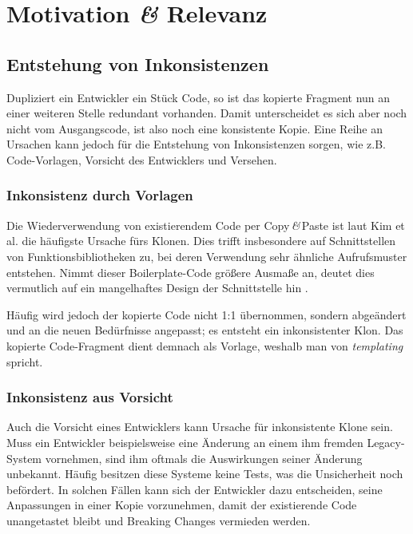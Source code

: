 \section{Motivation \textit{\&} Relevanz}

\subsection{Entstehung von Inkonsistenzen}

Dupliziert ein Entwickler ein Stück Code, so ist das kopierte Fragment nun an einer weiteren Stelle redundant vorhanden. Damit unterscheidet es sich aber noch nicht vom Ausgangscode, ist also noch eine konsistente Kopie. Eine Reihe an Ursachen kann jedoch für die Entstehung von Inkonsistenzen sorgen, wie z.B. Code-Vorlagen, Vorsicht des Entwicklers und Versehen.


\subsubsection{Inkonsistenz durch Vorlagen}

Die Wiederverwendung von existierendem Code per Copy\,\textit{\&}\,Paste ist laut Kim et al. \cite{kim2004ethnographic} die häufigste Ursache fürs Klonen. Dies trifft insbesondere auf Schnittstellen von Funktionsbibliotheken zu, bei deren Verwendung sehr ähnliche Aufrufsmuster entstehen. Nimmt dieser Boilerplate-Code größere Ausmaße an, deutet dies vermutlich auf ein mangelhaftes Design der Schnittstelle hin \cite{koschke2013Similarity}.

Häufig wird jedoch der kopierte Code nicht 1:1 übernommen, sondern abgeändert und an die neuen Bedürfnisse angepasst; es entsteht ein inkonsistenter Klon. Das kopierte Code-Fragment dient demnach als Vorlage, weshalb man von \textit{templating} spricht.


\subsubsection{Inkonsistenz aus Vorsicht}

Auch die Vorsicht eines Entwicklers kann Ursache für inkonsistente Klone sein. Muss ein Entwickler beispielsweise eine Änderung an einem ihm fremden Legacy-System vornehmen, sind ihm oftmals die Auswirkungen seiner Änderung unbekannt. Häufig besitzen diese Systeme keine Tests, was die Unsicherheit noch befördert. In solchen Fällen kann sich der Entwickler dazu entscheiden, seine Anpassungen in einer Kopie vorzunehmen, damit der existierende Code unangetastet bleibt und Breaking Changes vermieden werden.


